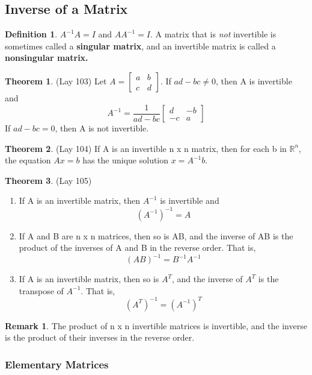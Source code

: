 \documentclass[12pt]{article}
\theoremstyle{definition}
\newtheorem{theorem}{Theorem}  %
\newtheorem{definition}{Definition} %
\newtheorem*{remark}{Remark}        %
\numberwithin{equation}{theorem}    %
\newcommand{\drawvec}[1]{                    %
    \begin{bmatrix}
        #1
    \end{bmatrix}
}
\begin{document}
\subsection{Inverse of a Matrix}

\begin{definition}
    $A^{-1}A=I$ and $AA^{-1}=I$. A matrix that is \emph{not} invertible is sometimes called a \textbf{singular matrix}, and an invertible matrix is called a \textbf{nonsingular matrix.}
\end{definition}

\begin{theorem}(Lay 103)
    Let $A=\drawvec{a & b \\ c & d}$. If $ad-bc \neq 0$, then A is invertible and $$A^{-1}=\frac{1}{ad-bc} \drawvec{d & -b \\ -c & a}$$ If $ad-bc=0$, then A is not invertible.
\end{theorem}

\begin{theorem}(Lay 104)
    If A is an invertible n x n matrix, then for each b in $\mathbb{R}^n$, the equation $Ax=b$ has the unique solution $x=A^{-1}b$.
\end{theorem}

\begin{theorem}(Lay 105)
    \begin{enumerate}
        \item If A is an invertible matrix, then $A^{-1}$ is invertible and $$(A^{-1})^{-1}=A$$
        \item If A and B are n x n matrices, then so is AB, and the inverse of AB is the product of the inverses of A and B in the reverse order. That is, $$(AB)^{-1}=B^{-1}A^{-1}$$
        \item If A is an invertible matrix, then so is $A^T$, and the inverse of $A^T$ is the transpose of $A^{-1}$. That is, $$(A^T)^{-1}=(A^{-1})^T$$
    \end{enumerate}
    \begin{remark}
        The product of n x n invertible matrices is invertible, and the inverse is the product of their inverses in the reverse order.
    \end{remark}
\end{theorem}

\subsubsection{Elementary Matrices}
\end{document}
